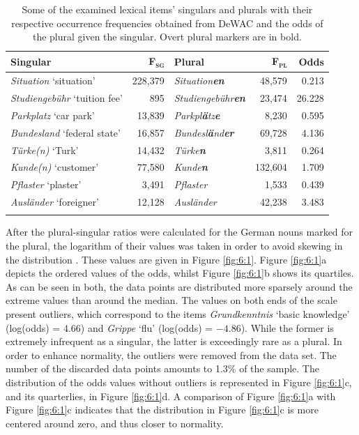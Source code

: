 \begin{table} 
\begin{tabular}{lr lrr} 
    \lsptoprule
	Singular & F\textsubscript{\textsc{sg}} & Plural & F\textsubscript{\textsc{pl}} & Odds\\\midrule
	\textit{Situation} `situation' & 228,379 & \textit{Situation\textbf{en}} & 48,579 & 0.213\\  
	\textit{Studiengebühr} `tuition fee' & 895 & \textit{Studiengebühr\textbf{en}} & 23,474 & 26.228\\ 
	\textit{Parkplatz} `car park' & 13,839 & \textit{Parkpl\textbf{ä}tz\textbf{e}} & 8,230 & 0.595\\ 
	\textit{Bundesland} `federal state' & 16,857 & \textit{Bundesl\textbf{ä}nd\textbf{er}} & 69,728 & 4.136\\ 
	\textit{Türke(n)} `Turk' & 14,432 & \textit{Türke\textbf{n}} & 3,811 & 0.264\\ 
	\textit{Kunde(n)} `customer' & 77,580 & \textit{Kunde\textbf{n}} & 132,604 & 1.709\\ 
	\textit{Pflaster} `plaster' & 3,491 & \textit{Pflaster} & 1,533 & 0.439\\ 
	\textit{Ausländer} `foreigner' & 12,128 & \textit{Ausländer} & 42,238 & 3.483\\  
	\lspbottomrule 
	\end{tabular}
	\caption{Some of the examined lexical items’ singulars and plurals with their respective occurrence frequencies obtained from DeWAC and the odds of the plural given the singular. Overt plural markers are in bold.\label{tab:6:5}}
\end{table}

After the plural-singular ratios were calculated for the German nouns marked for the plural, the logarithm of their values was taken in order to avoid skewing in the distribution \citep[31]{baayen-analyzing}. These values are given in Figure \ref{fig:6:1}. Figure \ref{fig:6:1}a depicts the ordered values of the odds, whilst Figure \ref{fig:6:1}b shows its quartiles. As can be seen in both, the data points are distributed more sparsely around the extreme values than around the median. The values on both ends of the scale present outliers, which correspond to the items \textit{Grundkenntnis} `basic knowledge' (log(odds) = 4.66) and \textit{Grippe} `flu' (log(odds) = $-4.86$). While the former is extremely infrequent as a singular, the latter is exceedingly rare as a plural. In order to enhance normality, the outliers were removed from the data set. The number of the discarded data points amounts to 1.3\% of the sample. The distribution of the odds values without outliers is represented in Figure \ref{fig:6:1}c, and its quarterlies, in Figure \ref{fig:6:1}d. A comparison of Figure \ref{fig:6:1}a with Figure \ref{fig:6:1}c indicates that the distribution in Figure \ref{fig:6:1}c is more centered around zero, and thus closer to normality.

